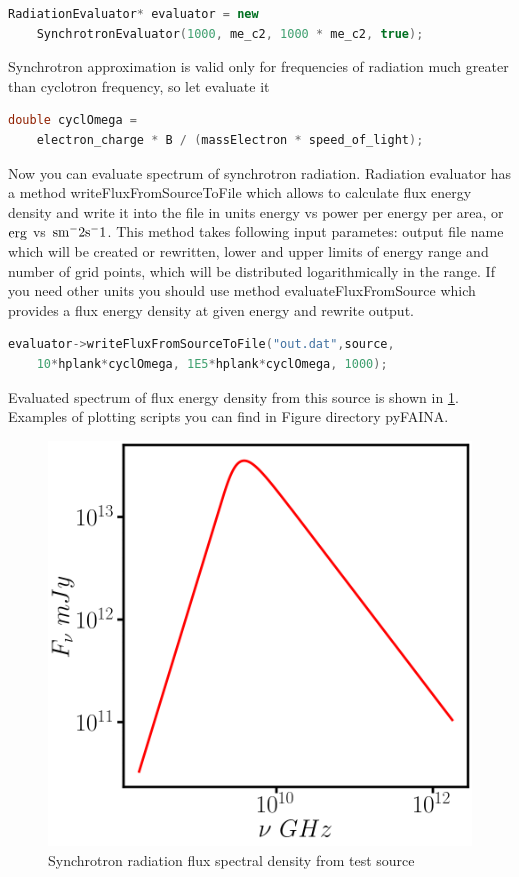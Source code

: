 \begin{lstlisting}[language=c++]
	RadiationEvaluator* evaluator = new 
	SynchrotronEvaluator(1000, me_c2, 1000 * me_c2, true);
\end{lstlisting}

Synchrotron approximation is valid only for frequencies of radiation much greater than cyclotron frequency, so let evaluate it

\begin{lstlisting}[language=c++]
	double cyclOmega = 
	electron_charge * B / (massElectron * speed_of_light);
\end{lstlisting}

Now you can evaluate spectrum of synchrotron radiation. Radiation evaluator has a method writeFluxFromSourceToFile which allows to calculate flux energy density and write it into the file in units energy vs power per energy per area, or $\rm erg$ vs $\rm sm^-2 s^-1$. This method takes following input parametes: output file name which will be created or rewritten, lower and upper limits of energy range and number of grid points, which will be distributed logarithmically in the range. If you need other units you should use method evaluateFluxFromSource which provides a flux energy density at given energy and rewrite output.

\begin{lstlisting}[language=c++]
	evaluator->writeFluxFromSourceToFile("out.dat",source, 
	10*hplank*cyclOmega, 1E5*hplank*cyclOmega, 1000);
\end{lstlisting}


Evaluated spectrum of flux energy density from this source is shown in \ref{example0}. Examples of plotting scripts you can find in Figure directory pyFAINA.
\begin{figure}
	\centering
	\includegraphics[width=12.5 cm]{./fig_en/example0.png} 
	\caption{Synchrotron radiation flux spectral density from test source}
	\label{example0}
\end{figure}
